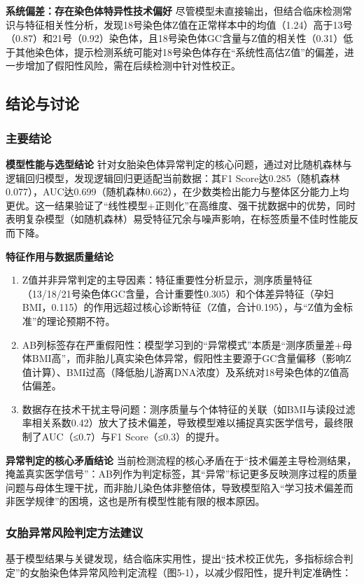 \documentclass[withoutpreface,bwprint]{cumcmthesis} %
\begin{document}
\textbf{系统偏差：存在染色体特异性技术偏好}
尽管模型未直接输出，但结合临床检测常识与特征相关性分析，发现18号染色体Z值在正常样本中的均值（1.24）高于13号（0.87）和21号（0.92）染色体，且18号染色体GC含量与Z值的相关性（0.31）低于其他染色体，提示检测系统可能对18号染色体存在“系统性高估Z值”的偏差，进一步增加了假阳性风险，需在后续检测中针对性校正。


\subsection{结论与讨论}
\subsubsection{主要结论}
\textbf{模型性能与选型结论}
针对女胎染色体异常判定的核心问题，通过对比随机森林与逻辑回归模型，发现逻辑回归更适配当前数据：其F1 Score达0.285（随机森林0.077），AUC达0.699（随机森林0.662），在少数类检出能力与整体区分能力上均更优。这一结果验证了“线性模型+正则化”在高维度、强干扰数据中的优势，同时表明复杂模型（如随机森林）易受特征冗余与噪声影响，在标签质量不佳时性能反而下降。

\textbf{特征作用与数据质量结论}
\begin{enumerate}
    \item Z值并非异常判定的主导因素：特征重要性分析显示，测序质量特征（13/18/21号染色体GC含量，合计重要性0.305）和个体差异特征（孕妇BMI，0.115）的作用远超过核心诊断特征（Z值，合计0.195），与“Z值为金标准”的理论预期不符。
    \item AB列标签存在严重假阳性：模型学习到的“异常模式”本质是“测序质量差+母体BMI高”，而非胎儿真实染色体异常，假阳性主要源于GC含量偏移（影响Z值计算）、BMI过高（降低胎儿游离DNA浓度）及系统对18号染色体的Z值高估偏差。
    \item 数据存在技术干扰主导问题：测序质量与个体特征的关联（如BMI与读段过滤率相关系数0.42）放大了技术偏差，导致模型难以捕捉真实医学信号，最终限制了AUC（≤0.7）与F1 Score（≤0.3）的提升。
\end{enumerate}

\textbf{异常判定的核心矛盾结论}
当前检测流程的核心矛盾在于“技术偏差主导检测结果，掩盖真实医学信号”：AB列作为判定标签，其“异常”标记更多反映测序过程的质量问题与母体生理干扰，而非胎儿染色体非整倍体，导致模型陷入“学习技术偏差而非医学规律”的困境，这也是所有模型性能有限的根本原因。


\subsubsection{女胎异常风险判定方法建议}
基于模型结果与关键发现，结合临床实用性，提出“技术校正优先，多指标综合判定”的女胎染色体异常风险判定流程（图5-1），以减少假阳性，提升判定准确性：
\end{document}
